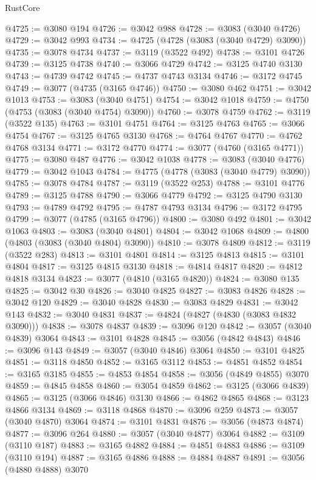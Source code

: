 \begin{lexlean}{RustCore}
\begin{coremodule}
@4725 := @3080 @194
@4726 := @3042 @988
@4728 := @3083 (@3040 @4726)
@4729 := @3042 @993
@4734 := @4725 (@4728 (@3083 (@3040 @4729) @3090))
@4735 := @3078 @4734
@4737 := @3119 (@3522 @492)
@4738 := @3101 @4726
@4739 := @3125 @4738
@4740 := @3066 @4729
@4742 := @3125 @4740 @3130
@4743 := @4739 @4742
@4745 := @4737 @4743 @3134
@4746 := @3172 @4745
@4749 := @3077 (@4735 (@3165 @4746))
@4750 := @3080 @462
@4751 := @3042 @1013
@4753 := @3083 (@3040 @4751)
@4754 := @3042 @1018
@4759 := @4750 (@4753 (@3083 (@3040 @4754) @3090))
@4760 := @3078 @4759
@4762 := @3119 (@3522 @135)
@4763 := @3101 @4751
@4764 := @3125 @4763
@4765 := @3066 @4754
@4767 := @3125 @4765 @3130
@4768 := @4764 @4767
@4770 := @4762 @4768 @3134
@4771 := @3172 @4770
@4774 := @3077 (@4760 (@3165 @4771))
@4775 := @3080 @487
@4776 := @3042 @1038
@4778 := @3083 (@3040 @4776)
@4779 := @3042 @1043
@4784 := @4775 (@4778 (@3083 (@3040 @4779) @3090))
@4785 := @3078 @4784
@4787 := @3119 (@3522 @253)
@4788 := @3101 @4776
@4789 := @3125 @4788
@4790 := @3066 @4779
@4792 := @3125 @4790 @3130
@4793 := @4789 @4792
@4795 := @4787 @4793 @3134
@4796 := @3172 @4795
@4799 := @3077 (@4785 (@3165 @4796))
@4800 := @3080 @492
@4801 := @3042 @1063
@4803 := @3083 (@3040 @4801)
@4804 := @3042 @1068
@4809 := @4800 (@4803 (@3083 (@3040 @4804) @3090))
@4810 := @3078 @4809
@4812 := @3119 (@3522 @283)
@4813 := @3101 @4801
@4814 := @3125 @4813
@4815 := @3101 @4804
@4817 := @3125 @4815 @3130
@4818 := @4814 @4817
@4820 := @4812 @4818 @3134
@4823 := @3077 (@4810 (@3165 @4820))
@4824 := @3080 @135
@4825 := @3042 @30
@4826 := @3040 @4825
@4827 := @3083 @4826
@4828 := @3042 @120
@4829 := @3040 @4828
@4830 := @3083 @4829
@4831 := @3042 @143
@4832 := @3040 @4831
@4837 := @4824 (@4827 (@4830 (@3083 @4832 @3090)))
@4838 := @3078 @4837
@4839 := @3096 @120
@4842 := @3057 (@3040 @4839) @3064
@4843 := @3101 @4828
@4845 := @3056 (@4842 @4843)
@4846 := @3096 @143
@4849 := @3057 (@3040 @4846) @3064
@4850 := @3101 @4825
@4851 := @3118 @4850
@4852 := @3165 @3112
@4853 := @4851 @4852
@4854 := @3165 @3185
@4855 := @4853 @4854
@4858 := @3056 (@4849 @4855) @3070
@4859 := @4845 @4858
@4860 := @3054 @4859
@4862 := @3125 (@3066 @4839)
@4865 := @3125 (@3066 @4846) @3130
@4866 := @4862 @4865
@4868 := @3123 @4866 @3134
@4869 := @3118 @4868
@4870 := @3096 @259
@4873 := @3057 (@3040 @4870) @3064
@4874 := @3101 @4831
@4876 := @3056 (@4873 @4874)
@4877 := @3096 @264
@4880 := @3057 (@3040 @4877) @3064
@4882 := @3109 (@3110 @187)
@4883 := @3165 @4882
@4884 := @4851 @4883
@4886 := @3109 (@3110 @194)
@4887 := @3165 @4886
@4888 := @4884 @4887
@4891 := @3056 (@4880 @4888) @3070

\end{coremodule}
\end{lexlean}
